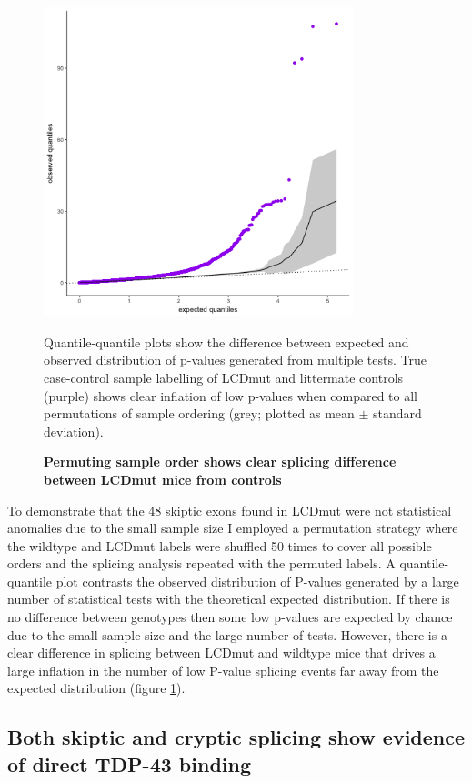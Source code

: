 \begin{figure}[h!]
	\centering
	\includegraphics[width=9cm]{Figures/05_tdp_mice/permutation_ribbon.png}
	\caption{\textbf{Permuting sample order shows clear splicing difference between LCDmut mice from controls}}
	Quantile-quantile plots show the difference between expected and observed distribution of p-values generated from multiple tests. True case-control sample labelling of LCDmut and littermate controls (purple) shows clear inflation of low p-values when compared to all permutations of sample ordering (grey; plotted as mean $\pm$ standard deviation).
	\label{fig:permutation}
\end{figure}

To demonstrate that the 48 skiptic exons found in LCDmut were not statistical anomalies due to the small sample size I employed a permutation strategy where the wildtype and LCDmut labels were shuffled 50 times to cover all possible orders and the splicing analysis repeated with the permuted labels. A quantile-quantile plot contrasts the observed distribution of P-values generated by a large number of statistical tests with the theoretical expected distribution. If there is no difference between genotypes then some low p-values are expected by chance due to the small sample size and the large number of tests. However, there is a clear difference in splicing between LCDmut and wildtype mice that drives a large inflation in the number of low P-value splicing events far away from the expected distribution (figure \ref{fig:permutation}).   


\subsection{Both skiptic and cryptic splicing show evidence of direct TDP-43 binding}

